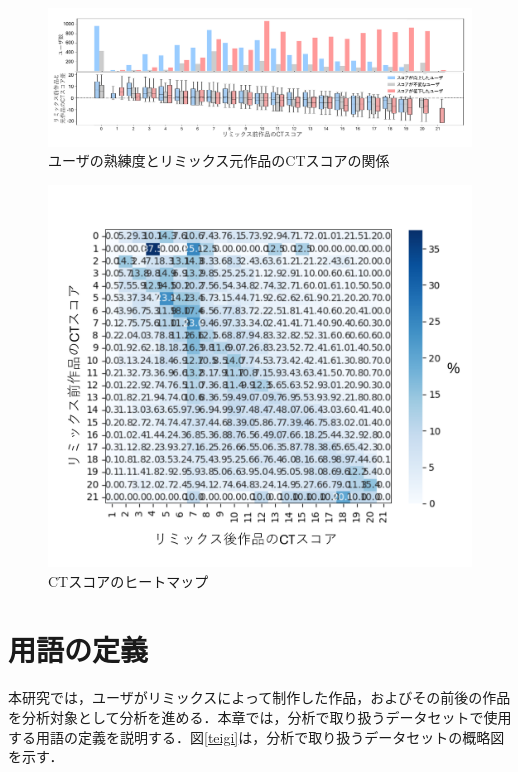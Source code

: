 \documentclass[submit,techrep,noauthor]{ipsj}
\begin{document}
\begin{figure}[t]
  \centering
  \includegraphics[width=\textwidth]{@IPSJ_SIGSE202511_Horio/fig/preAnalysis.pdf}
  \caption{ユーザの熟練度とリミックス元作品のCTスコアの関係}
  \label{preAnalysis}
\end{figure}
\begin{figure}[h]
  \centering
  \includegraphics[width=\linewidth]{@IPSJ_SIGSE202511_Horio/fig/heatmapCT.pdf}
  \caption{CTスコアのヒートマップ}
  \label{heatmapCT}
\end{figure}

\section{用語の定義}
\label{sec:preAnalysis}

本研究では，ユーザがリミックスによって制作した作品，およびその前後の作品を分析対象として分析を進める．本章では，分析で取り扱うデータセットで使用する用語の定義を説明する．図\ref{teigi}は，分析で取り扱うデータセットの概略図を示す．
\end{document}

